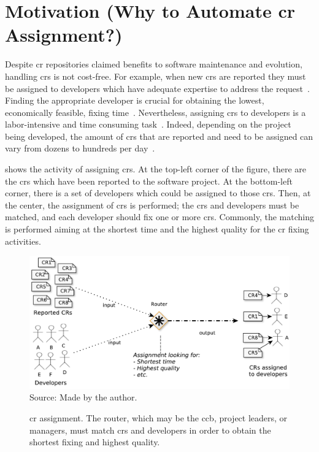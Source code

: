 \section[Motivation  (Why to Automate CR Assignment?)]{Motivation (Why to
Automate \ac{cr} Assignment?)}

Despite \ac{cr} repositories claimed benefits to software maintenance and
evolution, handling \acp{cr} is not cost-free. For example, when new \acp{cr}
are reported they must be assigned to developers which have adequate expertise
to address the request~\citep{Aljarah2011,Hosseini2012,Kagdi2012}. Finding the
appropriate developer is crucial for obtaining the lowest, economically
feasible, fixing time~\citep{Lucca2002}. Nevertheless, assigning \acp{cr} to
developers is a labor-intensive and time consuming
task~\citep{Anvik2006,Jeong2009}. Indeed, depending on the project being
developed, the amount of \acp{cr} that are reported and need to be assigned can
vary from dozens to hundreds per day~\citep{CavalcantiSQJ2011}.

 shows the activity of assigning \acp{cr}.
At the top-left corner of the figure, there are the \acp{cr} which have been
reported to the software project. At the bottom-left corner, there is a set of
developers which could be assigned to those \acp{cr}. Then, at the center, the
assignment of \acp{cr} is performed; the \acp{cr} and developers must be
matched, and each developer should fix one or more \acp{cr}. Commonly, the
matching is performed aiming at the shortest time and the highest quality for
the \ac{cr} fixing activities.

\begin{figure}[htp]
\centering
  \caption[\ac{cr} assignment.]{\ac{cr} assignment. The router, which may be the
  \acs{ccb}, project leaders, or managers, must match \acp{cr} and developers in
  order to obtain the shortest fixing and highest quality.}
  \includegraphics[width=\columnwidth]{images/assignment-schema.pdf}
  \footnotesize{Source: Made by the author.}
  \label{fig:assignment-schema}
\end{figure}

